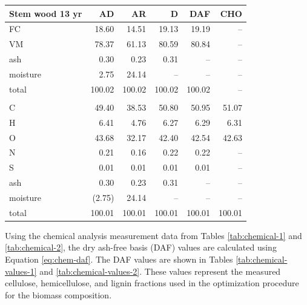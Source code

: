 \begin{center}
\begin{longtable}{lrrrrr}
    \textbf{Stem wood 13 yr} & AD & AR & D & DAF & CHO \\
    \midrule
    FC       & 18.60  & 14.51  & 19.13  & 19.19  & -- \\
    VM       & 78.37  & 61.13  & 80.59  & 80.84  & -- \\
    ash      & 0.30   & 0.23   & 0.31   & --     & -- \\
    moisture & 2.75   & 24.14  & --     & --     & -- \\
    total    & 100.02 & 100.02 & 100.02 & 100.02 & -- \\
    \\
    C        & 49.40  & 38.53  & 50.80  & 50.95  & 51.07 \\
    H        & 6.41   & 4.76   & 6.27   & 6.29   & 6.31 \\
    O        & 43.68  & 32.17  & 42.40  & 42.54  & 42.63 \\
    N        & 0.21   & 0.16   & 0.22   & 0.22   & -- \\
    S        & 0.01   & 0.01   & 0.01   & 0.01   & -- \\
    ash      & 0.30   & 0.23   & 0.31   & --     & -- \\
    moisture & (2.75) & 24.14  & --     & --     & -- \\
    total    & 100.01 & 100.01 & 100.01 & 100.01 & 100.01 \\
\end{longtable}
\end{center}

Using the chemical analysis measurement data from Tables \ref{tab:chemical-1} and \ref{tab:chemical-2}, the dry ash-free basis (DAF) values are calculated using Equation \ref{eq:chem-daf}. The DAF values are shown in Tables \ref{tab:chemical-values-1} and \ref{tab:chemical-values-2}. These values represent the measured cellulose, hemicellulose, and lignin fractions used in the optimization procedure for the biomass composition.

